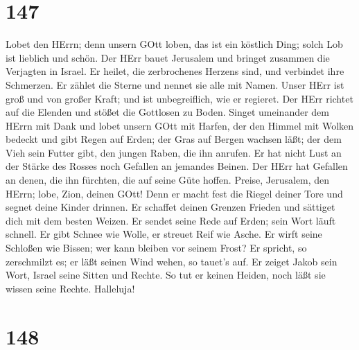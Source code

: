 \hypertarget{section-146}{%
\section{147}\label{section-146}}

 Lobet den HErrn; denn unsern GOtt loben, das ist ein
köstlich Ding; solch Lob ist lieblich und schön.  Der HErr
bauet Jerusalem und bringet zusammen die Verjagten in Israel.
 Er heilet, die zerbrochenes Herzens sind, und verbindet
ihre Schmerzen.  Er zählet die Sterne und nennet sie alle
mit Namen.  Unser HErr ist groß und von großer Kraft; und
ist unbegreiflich, wie er regieret.  Der HErr richtet auf
die Elenden und stößet die Gottlosen zu Boden.  Singet
umeinander dem HErrn mit Dank und lobet unsern GOtt mit Harfen,
 der den Himmel mit Wolken bedeckt und gibt Regen auf Erden;
der Gras auf Bergen wachsen läßt;  der dem Vieh sein Futter
gibt, den jungen Raben, die ihn anrufen.  Er hat nicht Lust
an der Stärke des Rosses noch Gefallen an jemandes Beinen. 
Der HErr hat Gefallen an denen, die ihn fürchten, die auf seine Güte
hoffen.  Preise, Jerusalem, den HErrn; lobe, Zion, deinen
GOtt!  Denn er macht fest die Riegel deiner Tore und segnet
deine Kinder drinnen.  Er schaffet deinen Grenzen Frieden
und sättiget dich mit dem besten Weizen.  Er sendet seine
Rede auf Erden; sein Wort läuft schnell.  Er gibt Schnee
wie Wolle, er streuet Reif wie Asche.  Er wirft seine
Schloßen wie Bissen; wer kann bleiben vor seinem Frost?  Er
spricht, so zerschmilzt es; er läßt seinen Wind wehen, so tauet's auf.
 Er zeiget Jakob sein Wort, Israel seine Sitten und Rechte.
 So tut er keinen Heiden, noch läßt sie wissen seine
Rechte. Halleluja!

\hypertarget{section-147}{%
\section{148}\label{section-147}}

